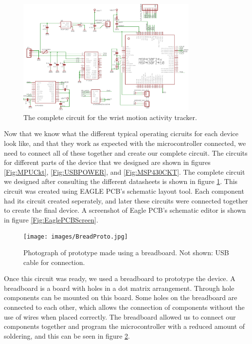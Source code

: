 \begin{figure}
\begin{center}
\includegraphics[angle=-90,width=0.8\textwidth]{images/FULLCKT.eps}
\caption{The complete circuit for the wrist motion activity tracker.}
\label{COMPCKT}
\end{center}
\end{figure}
Now that we know what the different typical operating cicruits for each device look like,
and that they work as expected with the microcontroller connected,
we need to connect all of these together and create our complete circuit.
The circuits for different parts of the device that we designed are shown in figures \ref{Fig:MPUCkt}, \ref{Fig:USBPOWER}, and \ref{Fig:MSP430CKT}.
The complete circuit we designed after consulting the different datasheets is shown in figure \ref{COMPCKT}.
This circuit was created using EAGLE PCB's schematic layout tool.
Each component had its circuit created seperately,
and later these circuits were connected together to create the final device.
A screenshot of Eagle PCB's schematic editor is shown in figure \ref{Fig:EaglePCBScreen}.
\begin{figure}
\begin{center}
\texttt{[image: images/BreadProto.jpg]}
\caption{Photograph of prototype made using a breadboard. Not shown: USB cable for connection.}
\label{Fig:BreadBoardProto}
\end{center}
\end{figure}

Once this circuit was ready, we used a breadboard to prototype the device.
A breadboard is a board with holes in a dot matrix arrangement.
Through hole components can be mounted on this board.
Some holes on the breadboard are connected to each other,
which allows the connection of components without the use of wires when placed correctly.
The breadboard allowed us to connect our components together and program the microcontroller with a reduced amount of soldering, 
and this can be seen in figure \ref{Fig:BreadBoardProto}.

